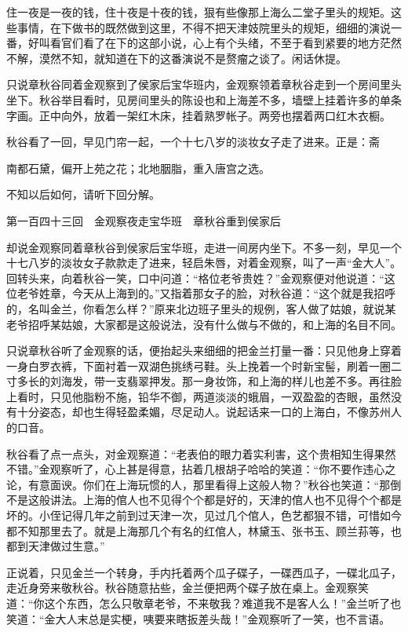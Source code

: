 \documentclass[12pt,UTF8]{ctexbook}
\begin{document}
{{{住一夜是一夜的钱，住十夜是十夜的钱，狠有些像那上海么二堂子里头的规矩。这些事情，在下做书的既然做到这里，不得不把天津妓院里头的规矩，细细的演说一番，好叫看官们看了在下的这部小说，心上有个头绪，不至于看到紧要的地方茫然不解，漠然不知，就知道在下的这番演说不是赘瘤之谈了。闲话休提。

只说章秋谷同着金观察到了侯家后宝华班内，金观察领着章秋谷走到一个房间里头坐下。秋谷举目看时，见房间里头的陈设也和上海差不多，墙壁上挂着许多的单条字画。正中向外，放着一架红木床，挂着熟罗帐子。两旁也摆着两口红木衣橱。

秋谷看了一回，早见门帘一起，一个十七八岁的淡妆女子走了进来。正是：斋

南都石黛，偏开上苑之花；北地胭脂，重入唐宫之选。

不知以后如何，请听下回分解。





第一百四十三回　金观察夜走宝华班　章秋谷重到侯家后





却说金观察同着章秋谷到侯家后宝华班，走进一间房内坐下。不多一刻，早见一个十七八岁的淡妆女子款款走了进来，轻启朱唇，对着金观察，叫了一声“金大人”。回转头来，向着秋谷一笑，口中问道：“格位老爷贵姓？”金观察便对他说道：“这位老爷姓章，今天从上海到的。”又指着那女子的脸，对秋谷道：“这个就是我招呼的，名叫金兰，你看怎么样？”原来北边班子里头的规例，客人做了姑娘，就说某老爷招呼某姑娘，大家都是这般说法，没有什么做与不做的，和上海的名目不同。

只说章秋谷听了金观察的话，便抬起头来细细的把金兰打量一番：只见他身上穿着一身白罗衣裤，下面衬着一双湖色挑绣弓鞋。头上挽着一个时新宝髻，刷着一圈二寸多长的刘海发，带一支翡翠押发。那一身妆饰，和上海的样儿也差不多。再往脸上看时，只见他脂粉不施，铅华不御，两道淡淡的蛾眉，一双盈盈的杏眼，虽然没有十分姿态，却也生得轻盈柔媚，尽足动人。说起话来一口的上海白，不像苏州人的口音。

秋谷看了点一点头，对金观察道：“老表伯的眼力着实利害，这个贵相知生得果然不错。”金观察听了，心上甚是得意，拈着几根胡子哈哈的笑道：“你不要作违心之论，有意面谀。你们在上海玩惯的人，那里看得上这般人物？”秋谷也笑道：“那倒不是这般讲法。上海的倌人也不见得个个都是好的，天津的倌人也不见得个个都是坏的。小侄记得几年之前到过天津一次，见过几个倌人，色艺都狠不错，可惜如今都不知那里去了。就是上海那几个有名的红倌人，林黛玉、张书玉、顾兰荪等，也都到天津做过生意。”

正说着，只见金兰一个转身，手内托着两个瓜子碟子，一碟西瓜子，一碟北瓜子，走近身旁来敬秋谷。秋谷随意拈些，金兰便把两个碟子放在桌上。金观察笑道：“你这个东西，怎么只敬章老爷，不来敬我？难道我不是客人么！”金兰听了也笑道：“金大人末总是实梗，咦要来瞎扳差头哉！”金观察听了一笑，也不言语。

}}}
\end{document}
